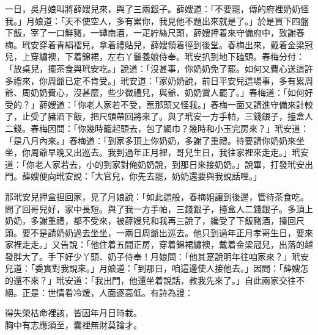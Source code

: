 一日，吳月娘叫將薛嫂兒來，與了三兩銀子。{}薛嫂道：「不要罷，傳的府裡奶奶怪我。」月娘道：「天不使空人，多有累你，我見他不題出來就是了。」於是買下四盤下飯，宰了一口鮮豬，一罈南酒，一疋紵絲尺頭，薛嫂押着來守備府中，致謝春梅。玳安穿着青絹褶兒，拿着禮貼兒，薛嫂領着徑到後堂。春梅出來，戴着金梁冠兒，上穿繡襖，下着錦裙，左右丫鬟養娘侍奉。玳安扒到地下磕頭。春梅分付：「放桌兒，擺茶食與玳安吃。」說道：「沒甚事，你奶奶免了罷。如何又費心送這許多禮來，你周爺已定不肯受。」玳安道：「家奶奶說，前日平安兒這場事，多有累周爺、周奶奶費心，沒甚麼，些少微禮兒，與爺、奶奶賞人罷了。」春梅道：「如何好受的？」薛嫂道：「你老人家若不受，惹那頭又怪我。」春梅一面又請進守備來計較了，止受了豬酒下飯，把尺頭帶回將來了。與了玳安一方手帕，三錢銀子，擡盒人二錢。春梅因問：「你幾時籠起頭去，包了網巾？幾時和小玉完房來？」{}玳安道：「是八月內來。」春梅道：「到家多頂上你奶奶，多謝了重禮。待要請你奶奶來坐坐，你周爺早晚又出巡去。我到過年正月裡，哥兒生日，我往家裡來走走。」玳安道：「你老人家若去，小的到家對俺奶奶說，到那日來接奶奶。」說畢，打發玳安出門。薛嫂便向玳安說：「大官兒，你先去罷，奶奶還要與我說話哩。」

那玳安兒押盒担回家，見了月娘說：「如此這般，春梅姐讓到後邊，管待茶食吃。問了回哥兒好，家中長短。與了我一方手帕，三錢銀子，擡盒人二錢銀子。多頂上奶奶，多謝重禮，都不受來，被薛嫂兒和我再三說了，纔受了下飯豬酒，擡回尺頭。要不是請奶奶過去坐坐，一兩日周爺出巡去。他只到過年正月孝哥生日，要來家裡走走。」又告說：「他住着五間正房，穿着錦裙繡襖，戴着金梁冠兒，出落的越發胖大了。手下好少丫頭、奶子侍奉！月娘問：「他其寔說明年往咱家來？」{}玳安兒道：「委實對我說來。」月娘道：「到那日，咱這邊使人接他去。」因問：「薛嫂怎的還不來？」玳安道：「我出門，他還坐着說話，教我先來了。」自此兩家交往不絕。正是：世情看冷煖，人面逐高低。有詩為證：

\begin{myquote}
得失榮枯命裡該，皆因年月日時栽。\\胸中有志應須至，囊裡無財莫論才。
\end{myquote}


